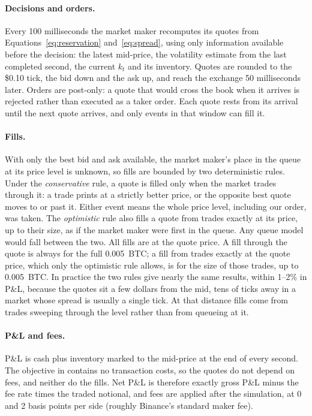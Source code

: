 \documentclass[11pt]{article}
\begin{document}
\paragraph{Decisions and orders.}
Every 100 milliseconds the market maker recomputes its quotes from Equations~\eqref{eq:reservation}
and~\eqref{eq:spread}, using only information available before the decision: the latest mid-price,
the volatility estimate from the last completed second, the current $k_t$ and its inventory. Quotes are
rounded to the \$0.10 tick, the bid down and the ask up, and reach the exchange 50 milliseconds later.
Orders are post-only: a quote that would cross the book when it arrives is rejected rather than executed
as a taker order. Each quote rests from its arrival until the next quote arrives, and only events in
that window can fill it.

\paragraph{Fills.}
With only the best bid and ask available, the market maker's place in the queue at its price level is
unknown, so fills are bounded by two deterministic rules. Under the \emph{conservative} rule, a quote is
filled only when the market trades through it: a trade prints at a strictly better price, or the
opposite best quote moves to or past it. Either event means the whole price level, including our order,
was taken. The \emph{optimistic} rule also fills a quote from trades exactly at its price, up to their
size, as if the market maker were first in the queue. Any queue model would fall between the two. All
fills are at the quote price. A fill through the quote is always for the full 0.005~BTC; a fill from
trades exactly at the quote price, which only the optimistic rule allows, is for the size of those trades,
up to 0.005~BTC.
In practice the two rules give nearly the same results, within 1--2\% in P\&L, because the quotes sit
a few dollars from the mid, tens of ticks away in a market whose spread is usually a single tick. At that
distance fills come from trades sweeping through the level rather than from queueing at it.

\paragraph{P\&L and fees.}
P\&L is cash plus inventory marked to the mid-price at the end of every second. The objective in
\citet{avellaneda2008} contains no transaction costs, so the quotes do not depend on fees, and neither do
the fills. Net P\&L is therefore exactly gross P\&L minus the fee rate times the traded notional, and fees
are applied after the simulation, at 0 and 2 basis points per side (roughly Binance's standard maker
fee).
\end{document}
